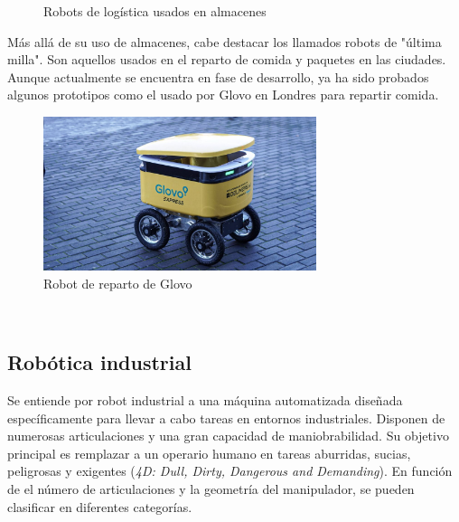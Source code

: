 \begin{figure} [ht!]
    \centering    
    \hspace{1cm}
    \caption{Robots de logística usados en almacenes}
\end{figure}

Más allá de su uso de almacenes, cabe destacar los llamados robots de "última milla". Son aquellos usados en el reparto de comida y 
paquetes en las ciudades. Aunque actualmente se encuentra en fase de desarrollo, ya ha sido probados algunos 
prototipos como el usado por Glovo en Londres para repartir comida.
\begin{figure} [ht!]
    \begin{center}
      \includegraphics[width=8cm]{figs/reparto.jpg}
    \end{center}
    \caption{Robot de reparto de Glovo}
    \label{fig:glovo}
\end{figure}\ 

\newpage
\subsection{Robótica industrial}
\label{sec:rob_industrial}
Se entiende por robot industrial a una máquina automatizada diseñada específicamente para llevar a cabo tareas en entornos industriales. 
Disponen de numerosas articulaciones y una gran capacidad de maniobrabilidad. Su objetivo principal es remplazar a un 
operario humano en tareas aburridas, sucias, peligrosas y exigentes (\textit{4D: Dull, Dirty, Dangerous and Demanding}).
En función de el número de articulaciones y la geometría del manipulador, se pueden clasificar en diferentes categorías.

